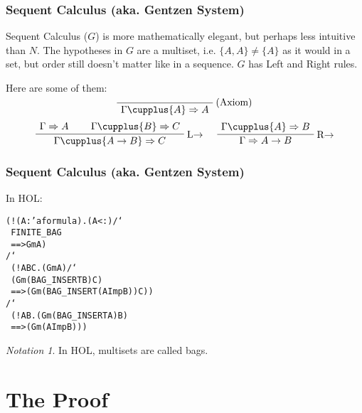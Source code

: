 \documentclass[english,svgnames,hide notes,12pt]{beamer}
\theoremstyle{definition}
\theoremstyle{remark}
\newtheorem{notn}{Notation}
\begin{document}
\begin{frame}
    \frametitle{Sequent Calculus (aka. Gentzen System)}
    Sequent Calculus ($G$) is more mathematically elegant, but perhaps less intuitive than $N$. The hypotheses in $G$ are a multiset, i.e. $\{A,A\}\neq\{A\}$ as it would in a set, but order still doesn't matter like in a sequence. $G$ has Left and Right rules.

    Here are some of them:
    \[
        \AxiomC{}
        \RightLabel{(Axiom)}
        \UnaryInfC{$\Gamma \cupplus \{A\}\Rightarrow A$}
        \DisplayProof
    \]
    \[
        \AxiomC{$\Gamma\Rightarrow A$}
        \AxiomC{$\Gamma\cupplus\{B\}\Rightarrow C$}
        \RightLabel{L$\to$}
        \BinaryInfC{$\Gamma\cupplus\{A\to B\}\Rightarrow C$}
        \DisplayProof
        \hspace{0.5cm}
        \AxiomC{$\Gamma\cupplus\{A\}\Rightarrow B$}
        \RightLabel{R$\to$}
        \UnaryInfC{$\Gamma\Rightarrow A\to B$}
        \DisplayProof
    \]
\end{frame}

\begin{frame}
    \frametitle{Sequent Calculus (aka. Gentzen System)}
    In HOL:
    \begin{alltt}
        (!(A:'a formula) \textGamma. (A <: \textGamma) /\char`\\\ FINITE_BAG \textGamma\\
        ~ ==> Gm \textGamma A)\\
        /\char`\\\ (!A B \textGamma C. (Gm \textGamma A) /\char`\\\ (Gm (BAG_INSERT B \textGamma) C)\\
        ~ ==> (Gm (BAG_INSERT (A Imp B) \textGamma) C))\\
        /\char`\\\ (!A B \textGamma. (Gm (BAG_INSERT A \textGamma) B)\\
        ~ ==> (Gm \textGamma (A Imp B)))\\
   \end{alltt}
   \begin{notn}
       In HOL, multisets are called bags.
   \end{notn}
\end{frame}

\section{The Proof}
\end{document}
